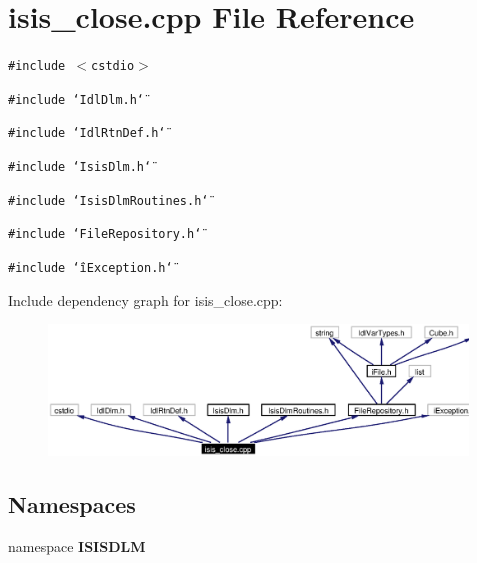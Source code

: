 \section{isis\_\-close.cpp File Reference}
\label{isis__close_8cpp}
{\tt \#include $<$cstdio$>$}\par
{\tt \#include \char`\"{}Idl\-Dlm.h\char`\"{}}\par
{\tt \#include \char`\"{}Idl\-Rtn\-Def.h\char`\"{}}\par
{\tt \#include \char`\"{}Isis\-Dlm.h\char`\"{}}\par
{\tt \#include \char`\"{}Isis\-Dlm\-Routines.h\char`\"{}}\par
{\tt \#include \char`\"{}File\-Repository.h\char`\"{}}\par
{\tt \#include \char`\"{}i\-Exception.h\char`\"{}}\par


Include dependency graph for isis\_\-close.cpp:\begin{figure}[H]
\begin{center}
\leavevmode
\includegraphics[width=316pt]{isis__close_8cpp__incl}
\end{center}
\end{figure}
\subsection*{Namespaces}
\begin{CompactItemize}
\item 
namespace {\bf ISISDLM}
\end{CompactItemize}
